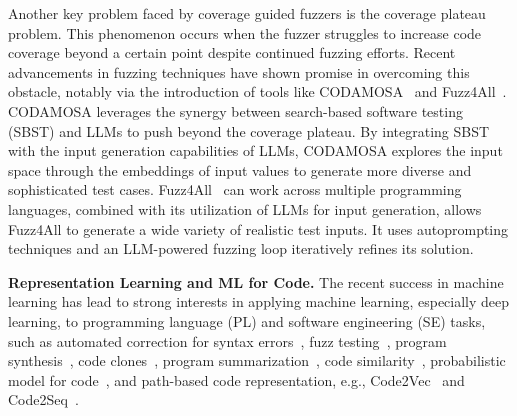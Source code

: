 Another key problem faced by coverage guided fuzzers is the coverage
plateau problem. This phenomenon occurs when the fuzzer struggles to
increase code coverage beyond a certain point despite continued
fuzzing efforts. Recent advancements in fuzzing techniques have shown
promise in overcoming this obstacle, notably via the introduction of
tools like CODAMOSA~\cite{10.1109/ICSE48619.2023.00085} and Fuzz4All~\cite{xia2024fuzz4all}.
CODAMOSA leverages the synergy between search-based software testing
(SBST) and LLMs to push beyond the coverage
plateau. By integrating SBST with the input generation capabilities of LLMs, CODAMOSA explores the input space through the embeddings of input values to generate more diverse and
sophisticated test cases. Fuzz4All~\cite{xia2024fuzz4all} can work across
multiple programming languages, combined with its utilization of LLMs
for input generation, allows Fuzz4All to generate a wide variety of
realistic test inputs. It uses autoprompting techniques and an
LLM-powered fuzzing loop iteratively refines its solution.




\textbf{Representation Learning and ML for Code.}  The recent success in
machine learning has lead to strong interests in applying machine
learning, especially deep learning, to programming language (PL) and
software engineering (SE) tasks, such as automated correction for
syntax errors~\cite{Bhatia-2016}, fuzz testing~\cite{Patra-2016},
program synthesis~\cite{Amodio-2017}, code
clones~\cite{White-2016,Smith-2009,Li-2017}, program
summarization~\cite{Allamanis-2016,Mou-2014}, code
similarity~\cite{Zhao-2018,Alon-2018}, probabilistic model for
code~\cite{Bielik-2016}, and path-based code representation,
e.g., Code2Vec~\cite{Alon-2018} and Code2Seq~\cite{alon2018code2seq}. 


